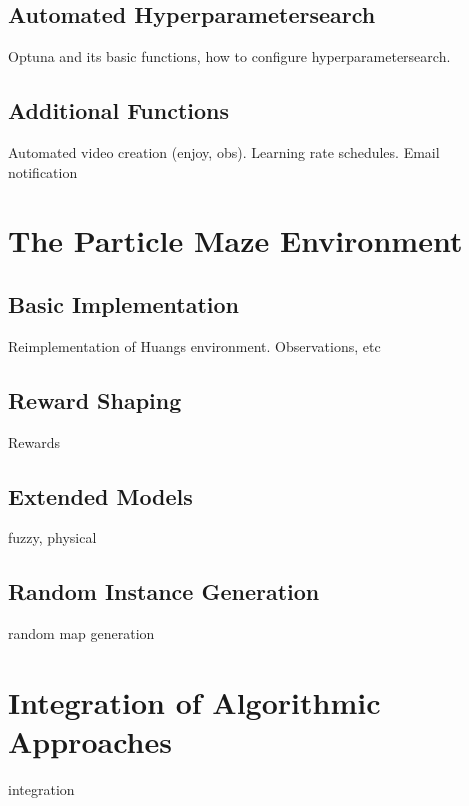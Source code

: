\subsection{Automated Hyperparametersearch} \label{sec:blSearch}
Optuna and its basic functions, how to configure hyperparametersearch.

\subsection{Additional Functions} \label{sec:blAdvanced}
Automated video creation (enjoy, obs).
Learning rate schedules.
Email notification


\section{The Particle Maze Environment} \label{sec:MazeEnvironment}

\subsection{Basic Implementation} \label{sec:MazeImplementation}
Reimplementation of Huangs environment. Observations, etc

\subsection{Reward Shaping} \label{sec:MazeReward}
Rewards

\subsection{Extended Models} \label{sec:ExtendedMaze}
fuzzy, physical 

\subsection{Random Instance Generation} \label{sec:RandomInstanceGeneration}
random map generation

\section{Integration of Algorithmic Approaches} \label{sec:AlgorithmIntegration}
integration


